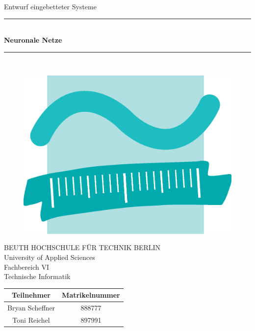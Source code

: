 \documentclass[12pt, parskip=half]{scrartcl}%
\begin{document}
%

\begin{titlepage}
	\vspace*{2.5cm}
	\begin{center}
		
		{\LARGE Entwurf eingebetteter Systeme} \\ [1cm]
		\rule{\textwidth}{1pt}\\ [0.5cm]
		\textbf{\Huge {Neuronale Netze}}
		\rule{\textwidth}{1pt}\\[2cm]
		
		\begin{figure}[h]
			\centering
			\includegraphics[width=0.2\linewidth]{./Bilder/Deckblatt/Beuth-Logo_single}
			\label{fig:Beuth-Logo_single}
		\end{figure}
		
		
		\bigskip 
		{\large BEUTH HOCHSCHULE FÜR TECHNIK BERLIN} \\
		University of Applied Sciences \\ 
		Fachbereich VI \\
		Technische Informatik\\ [5cm]
		
		\vfill	
		\large
		\begin{tabular}{|c|c|} %
			\hline
			\textbf{Teilnehmer} & \textbf{Matrikelnummer} \\ 
			\hline 
			Bryan Scheffner & 888777 \\ 
			Toni Reichel & 897991 \\ 
			\hline 
		\end{tabular}
		\normalsize
	\end{center}
\end{titlepage}

\tableofcontents
\setcounter{page}{2}
\newpage
		
\newcommand{\faq}[2]{%
	{\scshape Frage:} \normalfont\sffamily\textsf{#1}\par
	\noindent{\scshape Antwort:} #2
}

%
%
%
%
%

\newpage


%
%
%
%
\end{document}
